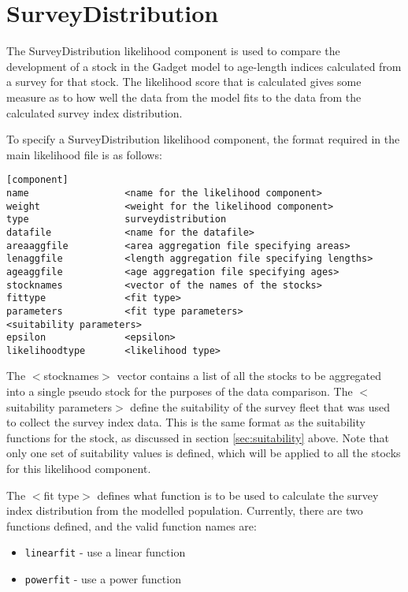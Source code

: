 \documentclass[]{book}
\providecommand{\tightlist}{%
  \setlength{\itemsep}{0pt}\setlength{\parskip}{0pt}}
\begin{document}
\hypertarget{sec:surveydistribution}{%
\section{SurveyDistribution}\label{sec:surveydistribution}}

The SurveyDistribution likelihood component is used to compare the
development of a stock in the Gadget model to age-length indices
calculated from a survey for that stock. The likelihood score that is
calculated gives some measure as to how well the data from the model
fits to the data from the calculated survey index distribution.

To specify a SurveyDistribution likelihood component, the format
required in the main likelihood file is as follows:

\begin{verbatim}
[component]
name                 <name for the likelihood component>
weight               <weight for the likelihood component>
type                 surveydistribution
datafile             <name for the datafile>
areaaggfile          <area aggregation file specifying areas>
lenaggfile           <length aggregation file specifying lengths>
ageaggfile           <age aggregation file specifying ages>
stocknames           <vector of the names of the stocks>
fittype              <fit type>
parameters           <fit type parameters>
<suitability parameters>
epsilon              <epsilon>
likelihoodtype       <likelihood type>
\end{verbatim}

The \(<\)stocknames\(>\) vector contains a list of all the stocks to be
aggregated into a single pseudo stock for the purposes of the data
comparison. The \(<\)suitability parameters\(>\) define the suitability of
the survey fleet that was used to collect the survey index data. This is
the same format as the suitability functions for the stock, as discussed
in section \ref{sec:suitability} above. Note that only one set of
suitability values is defined, which will be applied to all the stocks
for this likelihood component.

The \(<\)fit type\(>\) defines what function is to be used to calculate the
survey index distribution from the modelled population. Currently, there
are two functions defined, and the valid function names are:

\begin{itemize}
\tightlist
\item
  \texttt{linearfit} - use a linear function
\item
  \texttt{powerfit} - use a power function
\end{itemize}
\end{document}
